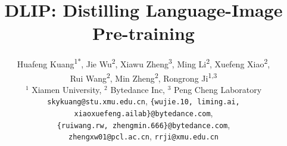 \documentclass[10pt,twocolumn,letterpaper]{article}
\begin{document}
\title{DLIP: Distilling Language-Image Pre-training}

\author{Huafeng Kuang\textsuperscript{1*}, \text{ } Jie Wu\textsuperscript{2}, \text{ } Xiawu Zheng\textsuperscript{3}, \text{ } Ming Li\textsuperscript{2}, \text{ } Xuefeng Xiao\textsuperscript{2}, \\
Rui Wang\textsuperscript{2}, \text{ } Min Zheng\textsuperscript{2}, \text{ } Rongrong Ji\textsuperscript{1,3} \\
$^{1}$ Xiamen University, \text{ } 
$^{2}$ Bytedance Inc, \text{ } 
$^{3}$ Peng Cheng Laboratory \\
{\tt\small skykuang@stu.xmu.edu.cn},
{\tt\small \{wujie.10, liming.ai, xiaoxuefeng.ailab\}@bytedance.com}, \\
{\tt\small \{ruiwang.rw, zhengmin.666\}@bytedance.com}, \\
{\tt\small zhengxw01@pcl.ac.cn}, 
{\tt\small rrji@xmu.edu.cn}
}

\maketitle
\ificcvfinal\thispagestyle{empty}\fi
\end{document}
